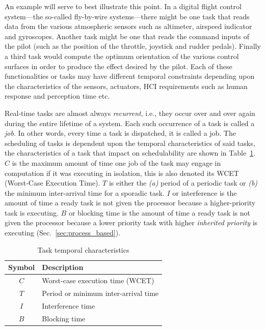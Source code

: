 An example will serve to best illustrate this point. In a digital
flight control system---the so-called fly-by-wire systems---there
might be one task that reads data from the various atmospheric sensors
such as altimeter, airspeed indicator and gyroscopes. Another task
might be one that reads the command inputs of the pilot (such as the
position of the throttle, joystick and rudder pedals). Finally a third
task would compute the optimum orientation of the various control
surfaces in order to produce the effect desired by the pilot. Each of
these functionalities or tasks may have different temporal constraints
depending upon the characteristics of the sensors, actuators, HCI
requirements such as human response and perception time etc.

Real-time tasks are almost always \emph{recurrent}, i.e., they occur
over and over again during the entire lifetime of a system. Each such
occurrence of a task is called a \emph{job}. In other words, every
time a task is dispatched, it is called a job. The scheduling of tasks
is dependent upon the temporal characteristics of said tasks, the
characteristics of a task that impact on schedulability are shown in
Table~\ref{tab:task_chars}. $C$ is the maximum amount of time one job
of the task may engage in computation if it was executing in
isolation, this is also denoted its WCET (Worst-Case Execution
Time). $T$ is either the \emph{(a)} period of a periodic task or
\emph{(b)} the minimum inter-arrival time for a sporadic task. $I$ or
interference is the amount of time a ready task is not given the
processor because a higher-priority task is executing. $B$ or blocking
time is the amount of time a ready task is not given the processor
because a lower priority task with higher \emph{inherited priority} is
executing (Sec.~\ref{sec:process_based}).

\begin{table}
\centering
\begin{tabular}{|c|l|}
\hline
\textbf{Symbol} & \textbf{Description}\\
\hline
$C$ & Worst-case execution time (WCET)\\
$T$ & Period or minimum inter-arrival time\\
$I$ & Interference time\\
$B$ & Blocking time\\
\hline
\end{tabular}
\caption{Task temporal characteristics}
\label{tab:task_chars}
\end{table}

